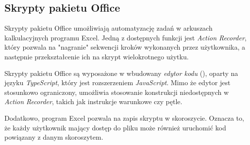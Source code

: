 \subsection{Skrypty pakietu Office}
Skrypty pakietu Office umożliwiają automatyzację zadań w arkuszach kalkulacyjnych programu Excel. Jedną z dostępnych funkcji jest \emph{Action Recorder}, który pozwala na "nagranie" sekwencji kroków wykonanych przez użytkownika, a następnie przekształcenie ich na skrypt wielokrotnego użytku.\par
Skrypty pakietu Office są wyposażone w wbudowany \emph{edytor kodu} (), oparty na języku \emph{TypeScript}, który jest rozszerzeniem \emph{JavaScript}. Mimo że edytor jest stosunkowo ograniczony, umożliwia stosowanie konstrukcji niedostępnych w \emph{Action Recorder}, takich jak instrukcje warunkowe czy pętle.\par
Dodatkowo, program Excel pozwala na zapis skryptu w skoroszycie. Oznacza to, że każdy użytkownik mający dostęp do pliku może również uruchomić kod powiązany z danym skoroszytem.